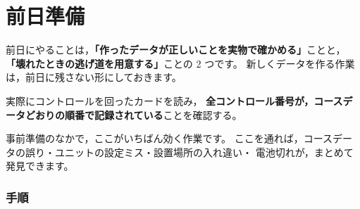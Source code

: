 \chapter{前日準備}

前日にやることは，\textbf{「作ったデータが正しいことを実物で確かめる」}ことと，
\textbf{「壊れたときの逃げ道を用意する」}ことの 2 つです。
新しくデータを作る作業は，前日に残さない形にしておきます。


\begin{Goal}
実際にコントロールを回ったカードを読み，
\textbf{全コントロール番号が，コースデータどおりの順番で記録されている}ことを確認する。
\end{Goal}

事前準備のなかで，ここがいちばん効く作業です。
ここを通れば，コースデータの誤り・ユニットの設定ミス・設置場所の入れ違い・
電池切れが，まとめて発見できます。

\subsection*{手順}

